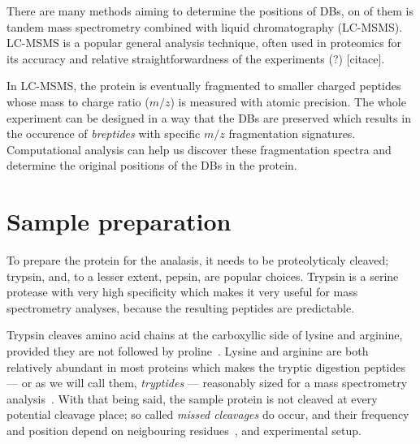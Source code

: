 There are many methods aiming to determine the positions of DBs, on of them is tandem mass spectrometry combined with liquid chromatography (LC-MSMS). LC-MSMS is a popular general analysis technique, often used in proteomics for its accuracy and relative straightforwardness of the experiments (?) [citace].

In LC-MSMS, the protein is eventually fragmented to smaller charged peptides whose mass to charge ratio (\(m/z\)) is measured with atomic precision. The whole experiment can be designed in a way that the DBs are preserved which results in the occurence of \emph{breptides} with specific \(m/z\) fragmentation signatures. Computational analysis can help us discover these fragmentation spectra and determine the original positions of the DBs in the protein.





\section{Sample preparation}\label{sec:trypsin}


To prepare the protein for the analasis, it needs to be proteolyticaly cleaved; trypsin, and, to a lesser extent, pepsin, are popular choices. Trypsin is a serine protease with very high specificity which makes it very useful for mass spectrometry analyses, because the resulting peptides are predictable.

Trypsin cleaves amino acid chains at the carboxyllic side of lysine and arginine, provided they are not followed by proline~\cite{olsen2004trypsin}. Lysine and arginine are both relatively abundant in most proteins which makes the tryptic digestion peptides --- or as we will call them, \emph{tryptides} --- reasonably sized for a mass spectrometry analysis~\cite{matthiesen2020trypticsize}. With that being said, the sample protein is not cleaved at every potential cleavage place; so called \emph{missed cleavages} do occur, and their frequency and position depend on neigbouring residues~\cite{gershon2014cleaved}, and experimental setup.

